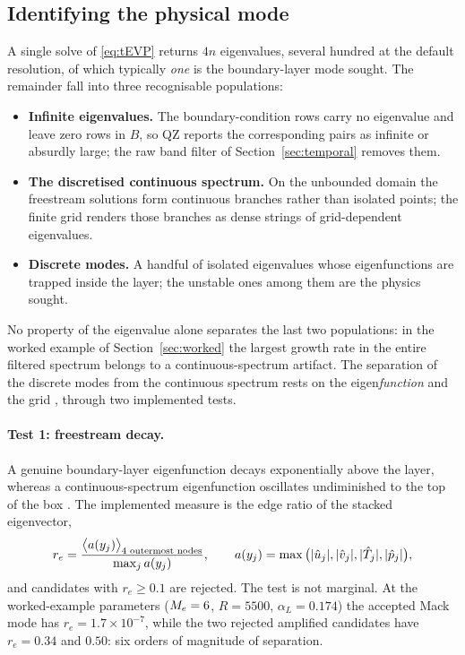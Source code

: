 \documentclass[11pt]{article}
\begin{document}
\subsection{Identifying the physical mode}\label{sec:modes}
A single solve of \eqref{eq:tEVP} returns $4n$ eigenvalues, several hundred at the default
resolution, of which typically \emph{one} is the boundary-layer mode sought. The remainder fall
into three recognisable populations:
\begin{itemize}[nosep,leftmargin=1.6em]
  \item \textbf{Infinite eigenvalues.} The boundary-condition rows carry no eigenvalue and leave
        zero rows in $B$, so QZ reports the corresponding pairs as infinite or absurdly large;
        the raw band filter of Section~\ref{sec:temporal} removes them.
  \item \textbf{The discretised continuous spectrum.} On the unbounded domain the freestream
        solutions form continuous branches rather than isolated points; the finite grid renders
        those branches as dense strings of grid-dependent eigenvalues.
  \item \textbf{Discrete modes.} A handful of isolated eigenvalues whose eigenfunctions are
        trapped inside the layer; the unstable ones among them are the physics sought.
\end{itemize}
No property of the eigenvalue alone separates the last two populations: in the worked example of
Section~\ref{sec:worked} the largest growth rate in the entire filtered spectrum belongs to a
continuous-spectrum artifact. The separation of the discrete modes from the continuous spectrum rests
on the eigen\emph{function} and the grid \cite{grosch1978,balakumar1992}, through two implemented
tests.

\paragraph{Test 1: freestream decay.} A genuine boundary-layer eigenfunction decays exponentially
above the layer, whereas a continuous-spectrum eigenfunction oscillates undiminished to the top of
the box \cite{balakumar1992}. The implemented measure is the edge ratio of the stacked eigenvector,
\begin{equation}\label{eq:edgeratio}
  r_e=\frac{\big\langle a(y_j)\big\rangle_{\text{4 outermost nodes}}}{\max_j a(y_j)},
  \qquad a(y_j)=\max\big(|\hat{u}_j|,|\hat{v}_j|,|\hat{T}_j|,|\hat{p}_j|\big),
\end{equation}
and candidates with $r_e\ge0.1$ are rejected. The test is not marginal. At the worked-example
parameters ($M_e=6$, $R=5500$, $\alpha_L=0.174$) the accepted Mack mode has
$r_e=1.7\times10^{-7}$, while the two rejected amplified candidates have $r_e=0.34$ and $0.50$:
six orders of magnitude of separation.
\end{document}
